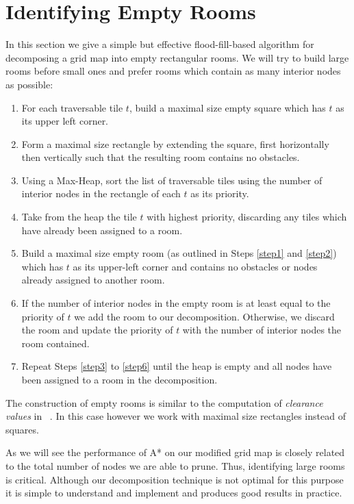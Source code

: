 \section{Identifying Empty Rooms}
\label{empty rooms}
In this section we give a simple but effective flood-fill-based algorithm for decomposing a 
grid map into empty rectangular rooms.
We will try to build large rooms before small ones and prefer rooms which
contain as many interior nodes as possible:

\begin{enumerate}
\item{\label{step1} For each traversable tile $t$, build a maximal size empty square which has
$t$ as its upper left corner.}
\item{\label{step2} Form a maximal size rectangle by extending the square, first horizontally then
vertically such that the resulting room contains no obstacles. }
\item{\label{step3} Using a Max-Heap, sort the list of traversable tiles using the number of
interior nodes in the rectangle of each $t$ as its priority.}
\item{\label{step4} Take from the heap the tile $t$ with highest priority,
discarding any tiles which have already been assigned to a room. }
\item{\label{step5} Build a maximal size empty room (as outlined in Steps
\ref{step1} and \ref{step2}) which has $t$ as its upper-left corner and 
contains no obstacles or nodes already assigned to another room.}
\item{\label{step6} If the number of interior nodes in the empty room is at least equal to the priority 
of $t$ we add the room to our decomposition. 
Otherwise, we discard the room and update the priority of $t$ with the number of interior 
nodes the room contained. }
\item{\label{step7} Repeat Steps \ref{step3} to \ref{step6} until the heap is
empty and all nodes have been assigned to a room in the decomposition.}
\end{enumerate}

The construction of empty rooms is similar to the computation of \emph{clearance
values} in \citeauthor{harabor08}~. 
In this case however we work with maximal size rectangles instead of squares. 
\par
As we will see the performance of A* on our modified grid map is closely related to the total 
number of nodes we are able to prune.
Thus, identifying large rooms is critical.
Although our decomposition technique is not optimal for this purpose it is simple
to understand and implement and produces good results in practice.
